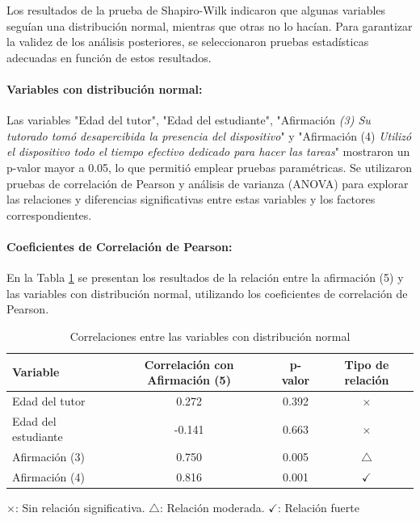 \documentclass[a4paper,fleqn]{cas-sc}
\begin{document}
					Los resultados de la prueba de Shapiro-Wilk indicaron que algunas variables seguían una distribución normal, mientras que otras no lo hacían. Para garantizar la validez de los análisis posteriores, se seleccionaron pruebas estadísticas adecuadas en función de estos resultados.
					
					\paragraph{\textbf{Variables con distribución normal:}}
					Las variables "Edad del tutor", "Edad del estudiante", "Afirmación \textit{(3) Su tutorado tomó desapercibida la presencia del dispositivo}" y "Afirmación (4) \textit{Utilizó el dispositivo todo el tiempo efectivo dedicado para hacer las tareas}" mostraron un p-valor mayor a 0.05, lo que permitió emplear pruebas paramétricas. Se utilizaron pruebas de correlación de Pearson y análisis de varianza (ANOVA) para explorar las relaciones y diferencias significativas entre estas variables y los factores correspondientes.
					
					\paragraph*{Coeficientes de Correlación de Pearson:}
					En la Tabla \ref{table:Pearson-Correlation} se presentan los resultados de la relación entre la afirmación (5) y las variables con distribución normal, utilizando los coeficientes de correlación de Pearson.
					
					\begin{table}[h!]
						\centering
						\caption{Correlaciones entre las variables con distribución normal}
						\begin{tabularx}{0.75\textwidth}{Xccc}
							\toprule
							\textbf{Variable} & \textbf{Correlación con Afirmación (5)} &  \textbf{p-valor} & \textbf{Tipo de relación} \\
							\midrule
							Edad del tutor & 0.272 & 0.392 & \(\times\) \\ %
							Edad del estudiante & -0.141 & 0.663 & \(\times\) \\ %
							Afirmación (3) & 0.750 & 0.005 & \(\bigtriangleup\) \\ %
							Afirmación (4) & 0.816 & 0.001 & \(\checkmark\) \\ %
							\bottomrule
						\end{tabularx}
						\label{table:Pearson-Correlation}
						\vspace{0.3em} %
						\parbox{0.75\textwidth}{\footnotesize \centering
							\(\times\): Sin relación significativa. \(\bigtriangleup\): Relación moderada. \(\checkmark\): Relación fuerte
						}
					\end{table}
					
\end{document}
